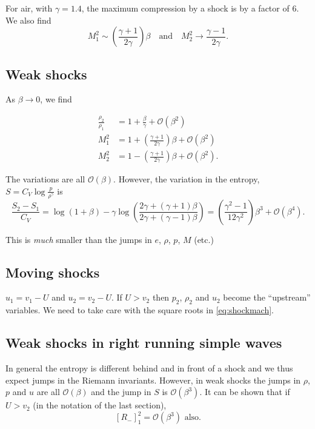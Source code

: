\documentclass{notes}
\newcommand{\cO}{\mathcal{O}}
\begin{document}
For air, with $\gamma = 1.4$, the maximum compression by a shock is
by a factor of $6$.  We also find
\[
M_1^2 \sim \left(\frac{\gamma + 1}{2 \gamma} \right) \beta \quad \text{and}
\quad M_2^2 \to \frac{\gamma -1}{2 \gamma}.
\]

\subsection{Weak shocks}

As $\beta \to 0$, we find

\begin{align*}
\frac{\rho_2}{\rho_1} &= 1 + \frac{\beta}{\gamma} + \cO(\beta^2) \\
M_1^2 & = 1+ \left( \frac{\gamma +1}{2 \gamma}\right) \beta
+ \cO(\beta^2) \\
M_2^2 & = 1 - \left( \frac{\gamma +1}{2 \gamma}\right) \beta
+ \cO(\beta^2).
\end{align*}

The variations are all $\cO(\beta)$.  However, the variation in the
entropy, $S=C_V \log \frac{p}{\rho^\gamma}$ is
\[
\frac{S_2 - S_1}{C_V} = \log \left(1 + \beta\right)- \gamma
\log \left( \frac{2 \gamma + (\gamma + 1)\beta}{2 \gamma + (\gamma-1) \beta}
\right) = \left( \frac{\gamma^2 - 1}{12 \gamma^2}\right) \beta^3
+ \cO(\beta^4).
\]

This is \emph{much} smaller than the jumps in $e$, $\rho$, $p$, $M$
(etc.)

\subsection{Moving shocks}

\vspace{1.5in}

$u_1 = v_1 - U$ and $u_2 = v_2 -U$.  If $U > v_2$ then $p_2$, $\rho_2$
and $u_2$ become the ``upstream'' variables.  We need to take care
with the square roots in \eqref{eq:shockmach}.

\subsection{Weak shocks in right running simple waves}

In general the entropy is different behind and in front of a shock and we
thus expect jumps in the Riemann invariants.  However, in weak shocks the
jumps in $\rho$, $p$ and $u$ are all $\cO(\beta)$ and the jump in
$S$ is $\cO(\beta^3)$.  It can be shown that if $U > v_2$ (in the notation
of the last section),
\[
\left[ R_- \right]_1^2 = \cO(\beta^3) \text{ also.}
\]
\end{document}
